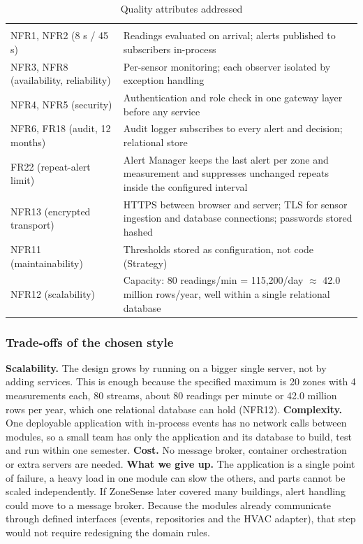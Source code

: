 \documentclass[11pt,a4paper]{article}
\begin{document}
{\small\stripe
\begin{xltabular}{\linewidth}{|L{4.6cm}|Y|}
\caption{Quality attributes addressed}\label{tab:quality}\\
\hline\headrow
{} & \\\hline
\endfirsthead
\hline\headrow
{} & \\\hline
\endhead
NFR1, NFR2 (8 s / 45 s) & Readings evaluated on arrival; alerts published to subscribers in-process\\\hline
NFR3, NFR8 (availability, reliability) & Per-sensor monitoring; each observer isolated by exception handling\\\hline
NFR4, NFR5 (security) & Authentication and role check in one gateway layer before any service\\\hline
NFR6, FR18 (audit, 12 months) & Audit logger subscribes to every alert and decision; relational store\\\hline
FR22 (repeat-alert limit) & Alert Manager keeps the last alert per zone and measurement and suppresses unchanged repeats inside the configured interval\\\hline
NFR13 (encrypted transport) & HTTPS between browser and server; TLS for sensor ingestion and database connections; passwords stored hashed\\\hline
NFR11 (maintainability) & Thresholds stored as configuration, not code (Strategy)\\\hline
NFR12 (scalability) & Capacity: 80 readings/min = 115,200/day $\approx$ 42.0 million rows/year, well within a single relational database\\\hline
\end{xltabular}}

\subsubsection*{Trade-offs of the chosen style}
\textbf{Scalability.} The design grows by running on a bigger single server, not by adding services. This is enough because the specified maximum is 20 zones with 4 measurements each, 80 streams, about 80 readings per minute or 42.0 million rows per year, which one relational database can hold (NFR12). \textbf{Complexity.} One deployable application with in-process events has no network calls between modules, so a small team has only the application and its database to build, test and run within one semester. \textbf{Cost.} No message broker, container orchestration or extra servers are needed. \textbf{What we give up.} The application is a single point of failure, a heavy load in one module can slow the others, and parts cannot be scaled independently. If ZoneSense later covered many buildings, alert handling could move to a message broker. Because the modules already communicate through defined interfaces (events, repositories and the HVAC adapter), that step would not require redesigning the domain rules.
\end{document}

